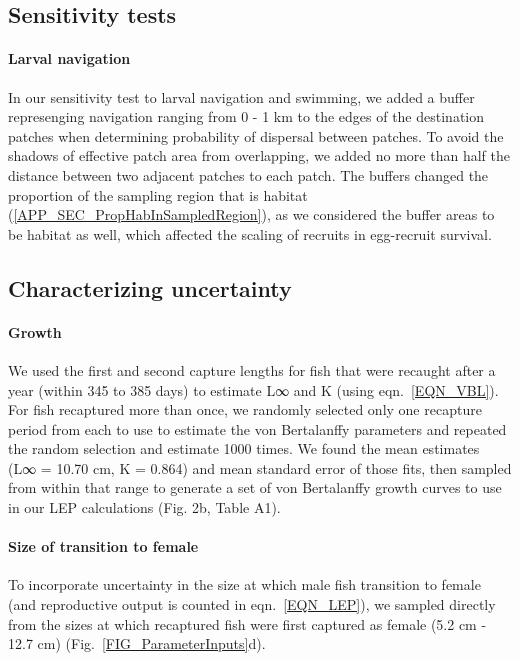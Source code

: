 \documentclass[12pt, oneside]{article}   	%
\begin{document}
\subsection{Sensitivity tests}

\paragraph{Larval navigation} \label{APP_SEC_METHODS_Larval_nav}

In our sensitivity test to larval navigation and swimming, we added a buffer represenging navigation ranging from 0 - 1 km to the edges of the destination patches when determining probability of dispersal between patches. To avoid the shadows of effective patch area from overlapping, we added no more than half the distance between two adjacent patches to each patch. The buffers changed the proportion of the sampling region that is habitat (\ref{APP_SEC_PropHabInSampledRegion}), as we considered the buffer areas to be habitat as well, which affected the scaling of recruits in egg-recruit survival.

\subsection{Characterizing uncertainty} \label{APP_SEC_Uncertainty}

\paragraph{Growth}

We used the first and second capture lengths for fish that were recaught after a year (within 345 to 385 days) to estimate L∞ and K (using eqn.\ \ref{EQN_VBL}). For fish recaptured more than once, we randomly selected only one recapture period from each to use to estimate the von Bertalanffy parameters and repeated the random selection and estimate 1000 times. We found the mean estimates (L∞ = 10.70 cm, K = 0.864) and mean standard error of those fits, then sampled from within that range to generate a set of von Bertalanffy growth curves to use in our LEP calculations (Fig. 2b, Table A1).

\paragraph{Size of transition to female}

 To incorporate uncertainty in the size at which male fish transition to female (and reproductive output is counted in eqn.\ \ref{EQN_LEP}), we sampled directly from the sizes at which recaptured fish were first captured as female (5.2 cm - 12.7 cm) (Fig.\ \ref{FIG_ParameterInputs}d).
\end{document}
